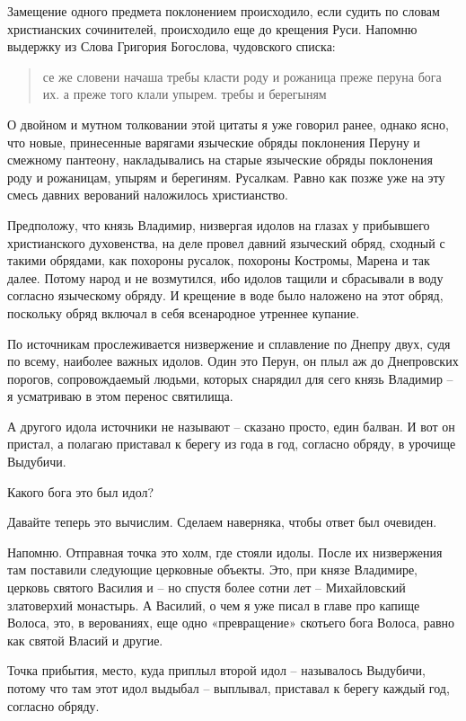 Замещение одного предмета поклонением происходило, если судить по словам христианских сочинителей, происходило еще до крещения Руси. Напомню выдержку из Слова Григория Богослова, чудовского списка:

\begin{quotation}
се же словени начаша требы класти роду и рожаница преже перуна бога их. а преже того клали упырем. требы и берегыням
\end{quotation}

О двойном и мутном толковании этой цитаты я уже говорил ранее, однако ясно, что новые, принесенные варягами языческие обряды поклонения Перуну и смежному пантеону, накладывались на старые языческие обряды поклонения роду и рожаницам, упырям и берегиням. Русалкам. Равно как позже уже на эту смесь давних верований наложилось христианство.

Предположу, что князь Владимир, низвергая идолов на глазах у прибывшего христианского духовенства, на деле провел давний языческий обряд, сходный с такими обрядами, как похороны русалок, похороны Костромы, Марена и так далее. Потому народ и не возмутился, ибо идолов тащили и сбрасывали в воду согласно языческому обряду. И крещение в воде было наложено на этот обряд, поскольку обряд включал в себя всенародное утреннее купание.

По источникам прослеживается низвержение и сплавление по Днепру двух, судя по всему, наиболее важных идолов. Один это Перун, он плыл аж до Днепровских порогов, сопровождаемый людьми, которых снарядил для сего князь Владимир – я усматриваю в этом перенос святилища. 

А другого идола источники не называют – сказано просто, един балван. И вот он пристал, а полагаю приставал к берегу из года в год, согласно обряду, в урочище Выдубичи.

Какого бога это был идол?

   Давайте теперь это вычислим. Сделаем наверняка, чтобы ответ был очевиден.

   Напомню. Отправная точка это холм, где стояли идолы. После их низвержения там поставили следующие церковные объекты. Это, при князе Владимире, церковь святого Василия и – но спустя более сотни лет – Михайловский златоверхий монастырь. А Василий, о чем я уже писал в главе про капище Волоса, это, в верованиях, еще одно «превращение» скотьего бога Волоса, равно как святой Власий и другие.

    Точка прибытия, место, куда приплыл второй идол – называлось Выдубичи, потому что там этот идол выдыбал – выплывал, приставал к берегу каждый год, согласно обряду.

